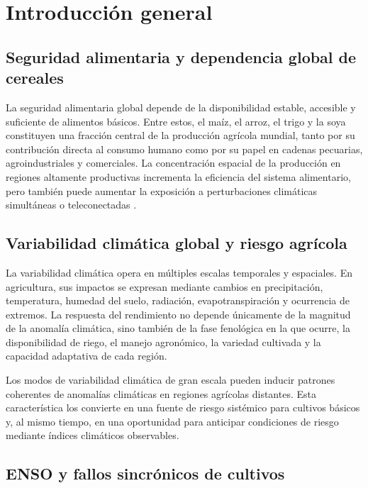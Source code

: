 \chapter{Introducción general}

\section{Seguridad alimentaria y dependencia global de cereales}

La seguridad alimentaria global depende de la disponibilidad estable, accesible y suficiente de alimentos básicos. Entre estos, el maíz, el arroz, el trigo y la soya constituyen una fracción central de la producción agrícola mundial, tanto por su contribución directa al consumo humano como por su papel en cadenas pecuarias, agroindustriales y comerciales. La concentración espacial de la producción en regiones altamente productivas incrementa la eficiencia del sistema alimentario, pero también puede aumentar la exposición a perturbaciones climáticas simultáneas o teleconectadas \parencite{anderson2019synchronous,anderson2023breadbasket}.


\section{Variabilidad climática global y riesgo agrícola}

La variabilidad climática opera en múltiples escalas temporales y espaciales. En agricultura, sus impactos se expresan mediante cambios en precipitación, temperatura, humedad del suelo, radiación, evapotranspiración y ocurrencia de extremos. La respuesta del rendimiento no depende únicamente de la magnitud de la anomalía climática, sino también de la fase fenológica en la que ocurre, la disponibilidad de riego, el manejo agronómico, la variedad cultivada y la capacidad adaptativa de cada región.

Los modos de variabilidad climática de gran escala pueden inducir patrones coherentes de anomalías climáticas en regiones agrícolas distantes. Esta característica los convierte en una fuente de riesgo sistémico para cultivos básicos y, al mismo tiempo, en una oportunidad para anticipar condiciones de riesgo mediante índices climáticos observables.

\section{ENSO y fallos sincrónicos de cultivos}

